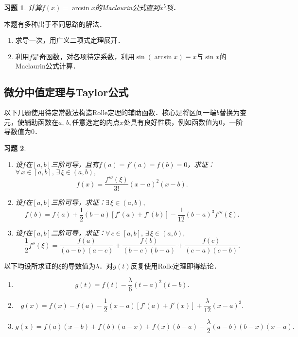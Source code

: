 \documentclass[11pt,a4paper]{ctexart}
\makeatletter
\theoremstyle{thmseries} %
\theoremstyle{exerseries}
\newtheorem{exer}{习题}[section]
\renewenvironment{proof}[1][\proofname]{\par
  \pushQED{\qed}%
  \normalfont \topsep6\p@\@plus6\p@\relax
  \trivlist
  \item[\hskip\labelsep
        \itshape
    #1\@addpunct{}]\ignorespaces
}{%
  \popQED\endtrivlist\@endpefalse
}
\newenvironment{sol}{\begin{proof}[\bfseries\upshape 解\quad]}{\end{proof}}
\newenvironment{pf}{\begin{proof}[\bfseries\upshape 证\quad]}{\end{proof}}
\newcommand{\sbra}[1]{\mathopen{}\left[#1\right]}
\makeatother
\begin{document}
\begin{exer}
	计算$f(x)=\arcsin x$的Maclaurin公式直到$x^5$项．
\end{exer}
\begin{sol}
	本题有多种出于不同思路的解法．
	\begin{enumerate}
		\item 求导一次，用广义二项式定理展开．
		\item 利用$f$是奇函数，对各项待定系数，利用$\sin(\arcsin x)\equiv x$与$\sin x$的Maclaurin公式计算．
	\end{enumerate}
\end{sol}


\subsection{微分中值定理与Taylor公式}
以下几题使用待定常数法构造Rolle定理的辅助函数．核心是将区间一端$b$替换为变元，使辅助函数在$a,\,b,$任意选定的内点$x$处具有良好性质，例如函数值为0，一阶导数值为0．
\begin{exer}
	\phantom{linebreak}
	\begin{enumerate}
		\item 设$f$在$[a,b]$三阶可导，且有$f(a)=f'(a)=f(b)=0$，求证：$\forall\,x\in[a,b],\,\exists\,\xi\in(a,b),$
		\[f(x)=\frac{f'''(\xi)}{3!}(x-a)^2(x-b).\]
		\item 设$f$在$[a,b]$三阶可导，求证：$\exists\,\xi\in(a,b),$
		\[f(b)=f(a)+\frac{1}{2}(b-a)[f'(a)+f'(b)]-\frac{1}{12}(b-a)^3f'''(\xi).\]
		\item 设$f$在$[a,b]$二阶可导，求证：$\forall\,c\in[a,b],\,\exists\,\xi\in(a,b),$
		\[\frac{1}{2}f''(\xi)=\frac{f(a)}{(a-b)(a-c)}+\frac{f(b)}{(b-c)(b-a)}+\frac{f(c)}{(c-a)(c-b)}.\]
	\end{enumerate}
\end{exer}
\begin{pf}
	以下均设所求证的$\xi$的导数值为$\lambda$．对$g(t)$反复使用Rolle定理即得结论．
	\begin{enumerate}
		\item \[g(t)=f(t)-\frac{\lambda}{6}(t-a)^2(t-b).\]
		\item \[g(x)=f(x)-f(a)-\frac{1}{2}(x-a)\sbra{f'(a)+f'(x)}+\frac{\lambda}{12}(x-a)^3.\]
		\item \[g(x)=f(a)(x-b)+f(b)(a-x)+f(x)(b-a)-\frac{\lambda}{2}(a-b)(b-x)(x-a).\]
	\end{enumerate}
\end{pf}
\end{document}
